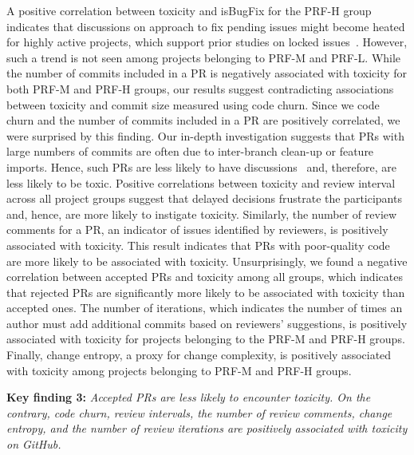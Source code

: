 A positive correlation between toxicity and isBugFix for the PRF-H group indicates that discussions on approach to fix pending issues might become heated for highly active projects, which support prior studies on locked issues~\cite{ferreira2022heated,miller2022did}. However, such a trend is not seen among projects belonging to PRF-M and PRF-L. While the number of commits included in a PR is negatively associated with toxicity for both PRF-M and PRF-H groups, our results suggest contradicting associations between toxicity and commit size measured using code churn. Since we code churn and the number of commits included in a PR are positively correlated, we were surprised by this finding. {Our in-depth investigation suggests that PRs with large numbers of commits are often due to inter-branch clean-up or feature imports.}
Hence, such PRs are less likely to have discussions~\cite{thongtanunam2017review} and, therefore, are less likely to be toxic. Positive correlations between toxicity and review interval across all project groups suggest that delayed decisions frustrate the participants and, hence, are more likely to instigate toxicity. 
Similarly, the number of review comments for a PR, an indicator of issues identified by reviewers, is positively associated with toxicity. This result indicates that PRs with poor-quality code are more likely to be associated with toxicity.
Unsurprisingly, we found a negative correlation between accepted PRs and toxicity among all groups, which indicates that rejected PRs are significantly more likely to be associated with toxicity than accepted ones.
The number of iterations, which indicates the number of times an author must add additional commits based on reviewers' suggestions, is positively associated with toxicity for projects belonging to the PRF-M and PRF-H groups. 
Finally, change entropy, a proxy for change complexity, is positively associated with toxicity among projects belonging to PRF-M and PRF-H groups. 


\begin{boxedtext}
\textbf{Key finding  3:} \emph{Accepted PRs are less likely to encounter toxicity. On the contrary,  code churn, review intervals, the number of review comments,  change entropy,  and the number of review iterations are positively associated with toxicity on GitHub. }
\end{boxedtext}




